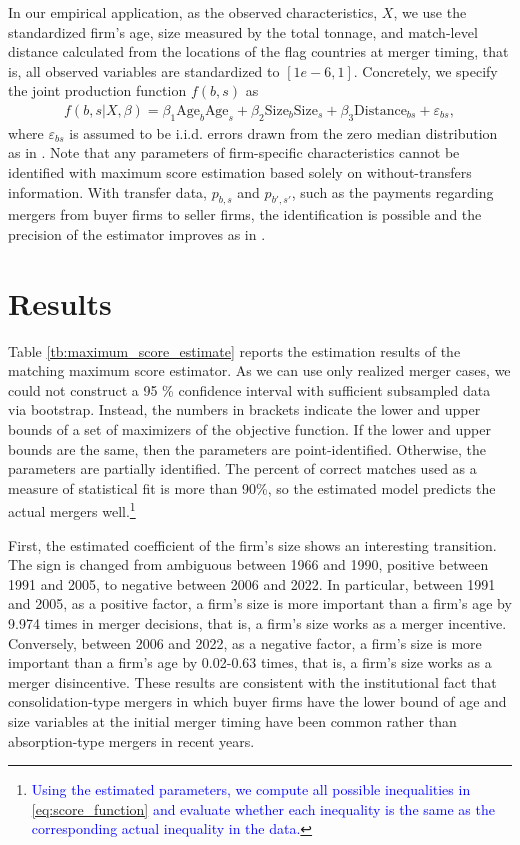 \documentclass[10pt]{article}
\begin{document}
In our empirical application, as the observed characteristics, $X$, we use the standardized firm's age, size measured by the total tonnage, and match-level distance calculated from the locations of the flag countries at merger timing, that is, all observed variables are standardized to $[1e-6,1]$. 
Concretely, we specify the joint production function $f(b,s)$ as
\begin{align}
    f(b,s|X,\beta)= \beta_1 \text{Age}_{b}\text{Age}_{s} + \beta_2 \text{Size}_{b}\text{Size}_{s} + \beta_3 \text{Distance}_{bs} + \varepsilon_{bs},\label{eq:joint_production}
\end{align}
where $\varepsilon_{bs}$ is assumed to be i.i.d. errors drawn from the zero median distribution as in \cite{fox2018qe}. 
Note that any parameters of firm-specific characteristics cannot be identified with maximum score estimation based solely on without-transfers information. With transfer data, $p_{b,s}$ and $p_{b',s'}$, such as the payments regarding mergers from buyer firms to seller firms, the identification is possible and the precision of the estimator improves as in \cite{akkus2015ms}.


\section{Results}\label{sec:results}

Table \ref{tb:maximum_score_estimate} reports the estimation results of the matching maximum score estimator. 
As we can use only realized merger cases, we could not construct a 95 \% confidence interval with sufficient subsampled data via bootstrap.
Instead, the numbers in brackets indicate the lower and upper bounds of a set of maximizers of the objective function. 
If the lower and upper bounds are the same, then the parameters are point-identified. 
Otherwise, the parameters are partially identified.
The percent of correct matches used as a measure of statistical fit is more than 90\%, so the estimated model predicts the actual mergers well.\footnote{\textcolor{blue}{Using the estimated parameters, we compute all possible inequalities in \eqref{eq:score_function} and evaluate whether each inequality is the same as the corresponding actual inequality in the data.}}

First, the estimated coefficient of the firm's size shows an interesting transition. 
The sign is changed from ambiguous between 1966 and 1990, positive between 1991 and 2005, to negative between 2006 and 2022. 
In particular, between 1991 and 2005, as a positive factor, a firm's size is more important than a firm's age by 9.974 times in merger decisions, that is, a firm's size works as a merger incentive.
Conversely, between 2006 and 2022, as a negative factor, a firm's size is more important than a firm's age by 0.02-0.63 times, that is, a firm's size works as a merger disincentive.
These results are consistent with the institutional fact that consolidation-type mergers in which buyer firms have the lower bound of age and size variables at the initial merger timing have been common rather than absorption-type mergers in recent years.
\end{document}
